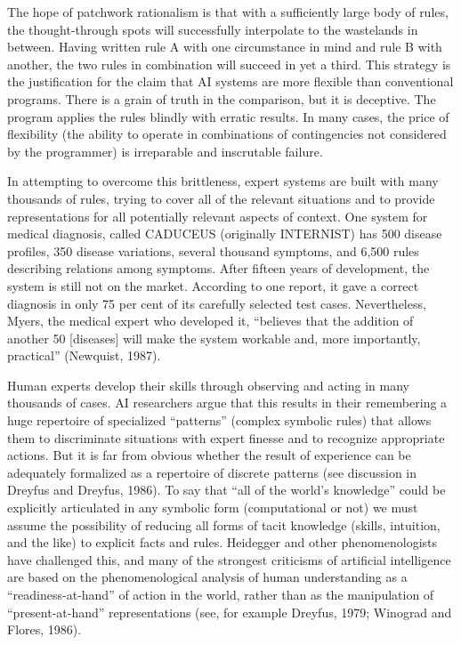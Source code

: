 \documentclass[12pt]{article}
\begin{document}
The hope of patchwork rationalism is that with a sufficiently large body of rules, the thought-through spots will successfully interpolate to the wastelands in between. Having written rule A with one circumstance in mind and rule B with another, the two rules in combination will succeed in yet a third. This strategy is the justification for the claim that AI systems are more flexible than conventional programs. There is a grain of truth in the comparison, but it is deceptive. The program applies the rules blindly with erratic results. In many cases, the price of flexibility (the ability to operate in combinations of contingencies not considered by the programmer) is irreparable and inscrutable failure.

In attempting to overcome this brittleness, expert systems are built with many thousands of rules, trying to cover all of the relevant situations and to provide representations for all potentially relevant aspects of context. One system for medical diagnosis, called CADUCEUS (originally INTERNIST) has 500 disease profiles, 350 disease variations, several thousand symptoms, and 6,500 rules describing relations among symptoms. After fifteen years of development, the system is still not on the market. According to one report, it gave a correct diagnosis in only 75 per cent of its carefully selected test cases. Nevertheless, Myers, the medical expert who developed it, ``believes that the addition of another 50 [diseases] will make the system workable and, more importantly, practical'' (Newquist, 1987).

Human experts develop their skills through observing and acting in many
thousands of cases. AI researchers argue that this results in their remembering a huge repertoire of specialized ``patterns'' (complex symbolic rules) that allows them to discriminate situations with expert finesse and to recognize appropriate actions. But it is far from obvious whether the result of experience can be adequately formalized as a repertoire of discrete patterns (see discussion in Dreyfus and Dreyfus, 1986). To say that ``all of the world’s knowledge'' could be explicitly articulated in any symbolic form (computational or not) we must assume the possibility of reducing all forms of tacit knowledge (skills, intuition, and the like) to explicit facts and rules. Heidegger and other phenomenologists have challenged this, and many of the strongest criticisms of artificial intelligence are based on the phenomenological analysis of human understanding as a ``readiness-at-hand'' of action in the world, rather than as the manipulation of ``present-at-hand'' representations (see, for example Dreyfus, 1979; Winograd and Flores, 1986).
\end{document}
